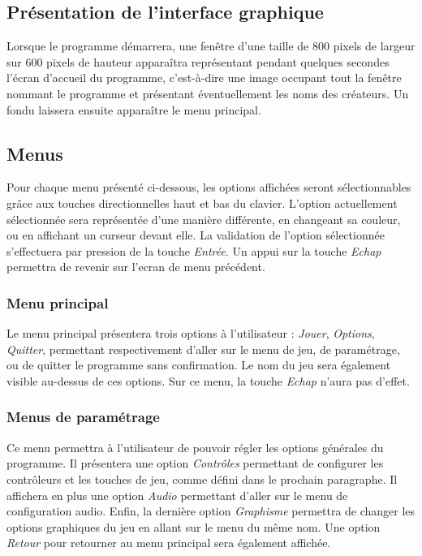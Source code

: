 \subsection{Présentation de l'interface graphique}

Lorsque le programme démarrera, une fenêtre d'une taille de 800 pixels de largeur sur 600 pixels de hauteur apparaîtra représentant pendant quelques secondes l'écran d'accueil du programme, c'est-à-dire une image occupant tout la fenêtre nommant le programme et présentant éventuellement les noms des créateurs. Un fondu laissera ensuite apparaître le menu principal.

\subsection{Menus}

Pour chaque menu présenté ci-dessous, les options affichées seront sélectionnables grâce aux touches directionnelles haut et bas du clavier. L'option  actuellement sélectionnée sera représentée d'une manière différente, en changeant sa couleur, ou en affichant un curseur devant elle. La validation de l'option sélectionnée s'effectuera par pression de la touche \emph{Entrée}. Un appui sur la touche \emph{Echap} permettra de revenir sur l'ecran de menu précédent.

\subsubsection{Menu principal}

Le menu principal présentera trois options à l'utilisateur : \emph{Jouer}, \emph{Options}, \emph{Quitter}, permettant respectivement d'aller sur le menu de jeu, de paramétrage, ou de quitter le programme sans confirmation. Le nom du jeu sera également visible au-dessus de ces options. Sur ce menu, la touche \emph{Echap} n'aura pas d'effet.

\subsubsection{Menus de paramétrage}

Ce menu permettra à l'utilisateur de pouvoir régler les options générales du programme. Il présentera une option \emph{Contrôles} permettant de configurer les contrôleurs et les touches de jeu, comme défini dans le prochain paragraphe. Il affichera en plus une option \emph{Audio} permettant d'aller sur le menu de configuration audio. Enfin, la dernière option \emph{Graphisme} permettra de changer les options graphiques du jeu en allant sur le menu du même nom. Une option \emph{Retour} pour retourner au menu principal sera également affichée.

